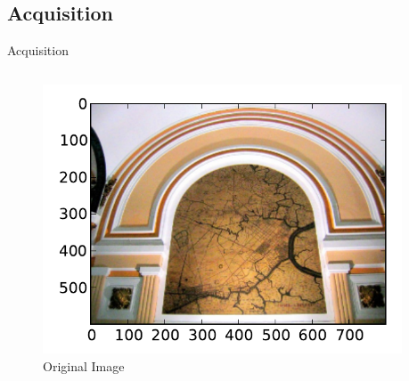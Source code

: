 \documentclass[mathserif]{beamer}
\begin{document}
\subsection{Acquisition}
\begin{frame}{Acquisition}
    \begin{columns}[T]
        \begin{column}{0.5\textwidth}
            \begin{figure}
                \includegraphics[width=\textwidth]{illustrations/input_example_color}
                \caption{Original Image}
            \end{figure}
        \end{column}
        \begin{column}{0.5\textwidth}
\end{column}
\end{columns}
\end{frame}
\end{document}

